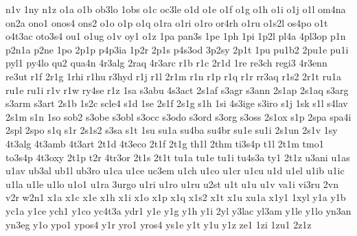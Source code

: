 {n1v
1ny
n1z
o1a
o1b
ob3lo
1obs
o1c
oc3le
o1d
o1e
o1f
o1g
o1h
o1i
o1j
o1l
om4na
on2a
ono1
onos4
ons2
o1o
o1p
o1q
o1ra
o1ri
o1ro
or4rh
o1ru
o1s2l
os4po
o1t
o4t3ac
oto3s4
ou1
o1ug
o1v
oy1
o1z
1pa
pan3s
1pe
1ph
1pi
1p2l
pl4a
4pl3op
p1n
p2n1a
p2ne
1po
2p1p
p4p3ia
1p2r
2p1s
p4s3od
3p2sy
2p1t
1pu
pu1b2
2pu1e
pu1i
pyl1
py4lo
qu2
qua4n
4r3alg
2raq
4r3arc
r1b
r1c
2r1d
1re
re3ch
regi3
4r3enn
re3ut
r1f
2r1g
1rhi
r1hu
r3hyd
r1j
r1l
2r1m
r1n
r1p
r1q
r1r
rr3aq
r1s2
2r1t
ru1a
ru1e
ru1i
r1v
r1w
ry4se
r1z
1sa
s3abu
4s3act
2s1af
s3agr
s3ann
2s1ap
2s1aq
s3arg
s3arm
s3art
2s1b
1s2c
scle4
s1d
1se
2s1f
2s1g
s1h
1si
4s3ige
s3iro
s1j
1sk
s1l
s4lav
2s1m
s1n
1so
sob2
s3obe
s3obl
s3occ
s3odo
s3ord
s3org
s3oss
2s1ox
s1p
2spa
spa4i
2spl
2spo
s1q
s1r
2s1s2
s3sa
s1t
1su
su1a
su4ba
su4br
su1e
su1i
2s1un
2s1v
1sy
4t3alg
4t3amb
4t3art
2t1d
4t3eco
2t1f
2t1g
th1l
2thm
ti3s4p
t1l
2t1m
tmo1
to3s4p
4t3oxy
2t1p
t2r
4tr3or
2t1s
2t1t
tu1a
tu1e
tu1i
tu4s3a
ty1
2t1z
u3ani
u1as
u1av
ub3al
ub1l
ub3ro
u1ca
u1ce
uc3em
u1ch
u1co
u1cr
u1cu
u1d
u1el
u1ib
u1ic
u1la
u1le
u1lo
u1o1
u1ra
3urgo
u1ri
u1ro
u1ru
u2st
u1t
u1u
u1v
va1i
vi3ru
2vn
v2r
w2n1
x1a
x1c
x1e
x1h
x1i
x1o
x1p
x1q
x1s2
x1t
x1u
xu1a
x1y1
1xyl
y1a
y1b
yc1a
y1ce
ych1
y1co
yc4t3a
ydr1
y1e
y1g
y1h
y1i
2yl
y3lac
yl3am
y1le
y1lo
yn3an
yn3eg
y1o
ypo1
ypos4
y1r
yro1
yros4
ys1e
y1t
y1u
y1z
ze1
1zi
1zu1
2z1z
}

